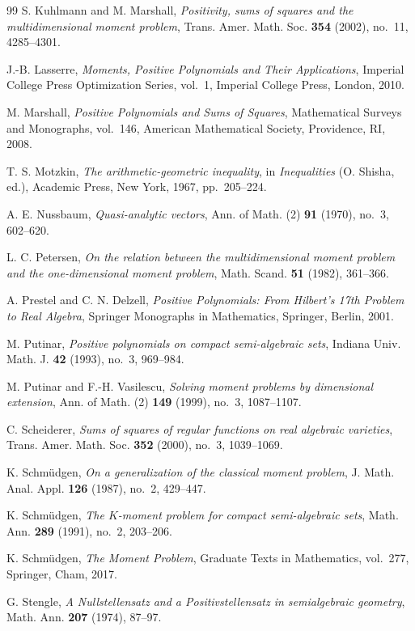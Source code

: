 \documentclass[11pt]{amsart}
\numberwithin{equation}{section}
\theoremstyle{definition}
\theoremstyle{remark}
\newcommand{\1}{\mathbf{1}}
\begin{document}
\begin{thebibliography}{99}
S. Kuhlmann and M. Marshall,
\emph{Positivity, sums of squares and the multidimensional moment problem},
Trans. Amer. Math. Soc. \textbf{354} (2002), no.~11, 4285--4301.

J.-B. Lasserre,
\emph{Moments, Positive Polynomials and Their Applications},
Imperial College Press Optimization Series, vol.~1,
Imperial College Press, London, 2010.

M. Marshall,
\emph{Positive Polynomials and Sums of Squares},
Mathematical Surveys and Monographs, vol.~146,
American Mathematical Society, Providence, RI, 2008.

T. S. Motzkin,
\emph{The arithmetic-geometric inequality},
in \emph{Inequalities} (O. Shisha, ed.),
Academic Press, New York, 1967, pp.~205--224.

A. E. Nussbaum,
\emph{Quasi-analytic vectors},
Ann. of Math. (2) \textbf{91} (1970), no.~3, 602--620.

L. C. Petersen,
\emph{On the relation between the multidimensional moment problem and the one-dimensional moment problem},
Math. Scand. \textbf{51} (1982), 361--366.

A. Prestel and C. N. Delzell,
\emph{Positive Polynomials: From Hilbert's 17th Problem to Real Algebra},
Springer Monographs in Mathematics,
Springer, Berlin, 2001.

M. Putinar,
\emph{Positive polynomials on compact semi-algebraic sets},
Indiana Univ. Math. J. \textbf{42} (1993), no.~3, 969--984.

M. Putinar and F.-H. Vasilescu,
\emph{Solving moment problems by dimensional extension},
Ann. of Math. (2) \textbf{149} (1999), no.~3, 1087--1107.

C. Scheiderer,
\emph{Sums of squares of regular functions on real algebraic varieties},
Trans. Amer. Math. Soc. \textbf{352} (2000), no.~3, 1039--1069.

K. Schm\"udgen,
\emph{On a generalization of the classical moment problem},
J. Math. Anal. Appl. \textbf{126} (1987), no.~2, 429--447.

K. Schm\"udgen,
\emph{The $K$-moment problem for compact semi-algebraic sets},
Math. Ann. \textbf{289} (1991), no.~2, 203--206.

K. Schm\"udgen,
\emph{The Moment Problem},
Graduate Texts in Mathematics, vol.~277,
Springer, Cham, 2017.

G. Stengle,
\emph{A Nullstellensatz and a Positivstellensatz in semialgebraic geometry},
Math. Ann. \textbf{207} (1974), 87--97.

\end{thebibliography}
\end{document}
